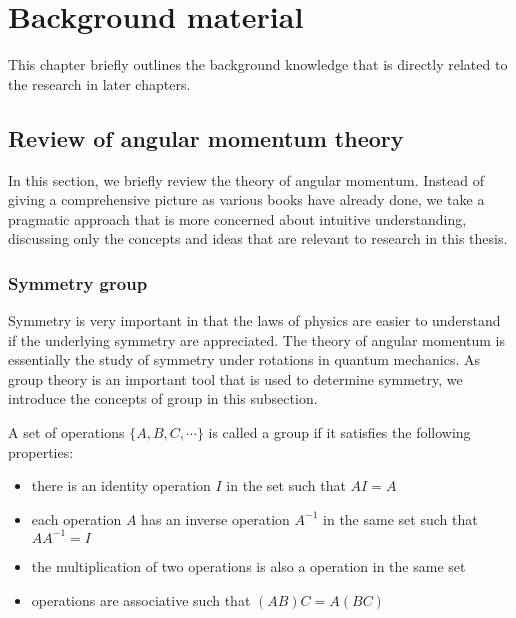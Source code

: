 
\chapter{Background material}
\label{ch:background}
This chapter  briefly outlines the background knowledge that is directly related to the research in later chapters.


\section{Review of angular momentum theory}
\label{sec:angularMomentum}

In this section, we briefly review the theory of angular momentum. Instead of giving a comprehensive 
picture as various books\cite{edmonds-book, rose-book, brink-book, zare-book, silver-book, kleinman-book, Varshalovich-book, sakurai-book, RotSpect} have already done, we take a pragmatic approach that is more concerned about intuitive 
understanding, discussing only the concepts and ideas that are relevant to research in this thesis. 

\subsection{Symmetry group}  
\label{sec:groupTheory}

Symmetry is very important in that the laws of physics are easier to understand if the underlying symmetry are 
appreciated. The theory of angular momentum is essentially the study of symmetry under rotations in quantum mechanics. 
As group theory is an important tool that is used to determine symmetry, we introduce the concepts of group
 in this subsection.

A set of operations $\{ A, B, C, \cdots \}$ is called a group if it satisfies the following properties:
\begin{itemize}
\item there is an identity operation $I$ in the set such that $A I = A$
\item  each operation $A$ has an inverse operation $A^{-1}$ in the same set such that $A A^{-1} = I$
\item  the multiplication of two operations is also a operation in the same set
\item  operations are associative such that $(AB)C = A(BC)$
\end{itemize}


